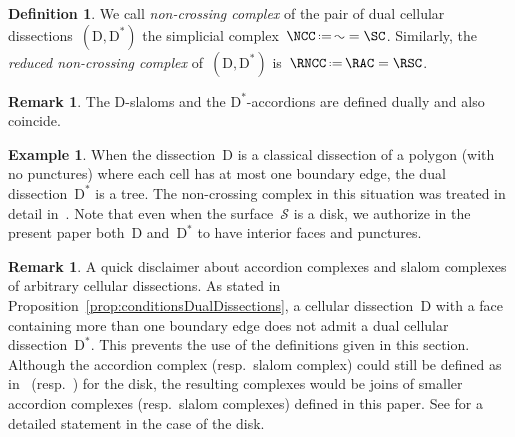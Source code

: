 \documentclass{amsart}
\theoremstyle{definition}
\newtheorem{definition}[theorem]{Definition}
\newtheorem{example}[theorem]{Example}
\newtheorem{remark}[theorem]{Remark}
\newcommand{\eqdef}{\mbox{\,\raisebox{0.2ex}{\scriptsize\ensuremath{\mathrm:}}\ensuremath{=}\,}} %
\newcommand{\darkblue}{\color{darkblue}} %
\newcommand{\defn}[1]{\textsl{\darkblue #1}} %
\newcommand{\surface}{\mathcal{S}} %
\newcommand{\dual}{^*} %
\newcommand{\dissection}{\mathrm{D}} %
\begin{document}
\begin{definition}
\label{def:noncrossingComplex}
We call \defn{non-crossing complex} of the pair of dual cellular dissections~$(\dissection, \dissection\dual)$ the simplicial complex~$\NCC \eqdef \AC = \SC$.
Similarly, the \defn{reduced non-crossing complex} of~$(\dissection, \dissection\dual)$ is~$\RNCC \eqdef \RAC = \RSC$.
\end{definition}


\begin{remark}
The $\dissection$-slaloms and the $\dissection\dual$-accordions are defined dually and also coincide.
\end{remark}

\begin{example}
When the dissection~$\dissection$ is a classical dissection of a polygon (with no punctures) where each cell has at most one boundary edge, the dual dissection~$\dissection\dual$ is a tree.
The non-crossing complex in this situation was treated in detail in~\cite{GarverMcConville, MannevillePilaud-accordion}.
Note that even when the surface~$\surface$ is a disk, we authorize in the present paper both~$\dissection$ and~$\dissection\dual$ to have interior faces and punctures.
\end{example}

\begin{remark}
A quick disclaimer about accordion complexes and slalom complexes of arbitrary cellular dissections.
As stated in Proposition~\ref{prop:conditionsDualDissections}, a cellular dissection~$\dissection$ with a face containing more than one boundary edge does not admit a dual cellular dissection~$\dissection\dual$.
This prevents the use of the definitions given in this section.
Although the accordion complex (resp.~slalom complex) could still be defined as in~\cite{MannevillePilaud-accordion} (resp.~\cite{GarverMcConville}) for the disk, the resulting complexes would be joins of smaller accordion complexes (resp.~slalom complexes) defined in this paper.
See \cite[Prop.~2.4]{MannevillePilaud-accordion} for a detailed statement in the case of the disk.
\end{remark}
\end{document}
